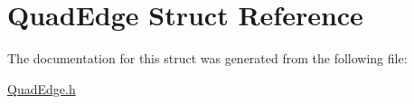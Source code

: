 \hypertarget{structQuadEdge}{
\section{QuadEdge Struct Reference}
\label{structQuadEdge}
}


The documentation for this struct was generated from the following file:\begin{DoxyCompactItemize}
\item 
\hyperlink{QuadEdge_8h}{QuadEdge.h}\end{DoxyCompactItemize}
